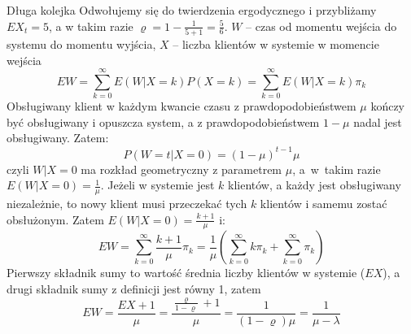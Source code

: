 \documentclass{mp}
\begin{document}
\begin{frame}{Długa kolejka}
{{	Odwołujemy się do twierdzenia ergodycznego i przybliżamy $EX_t=5$, a w takim razie $\varrho=1-\frac{1}{5+1}=\frac{5}{6}$.
}
{
	$W$ -- czas od momentu wejścia do systemu do momentu wyjścia, $X$ -- liczba klientów w systemie w momencie wejścia
	\[EW=\sum_{k=0}^\infty E(W|X=k)P(X=k)=\sum_{k=0}^\infty E(W|X=k)\pi_k \]
	Obsługiwany klient w każdym kwancie czasu z prawdopodobieństwem $\mu$ kończy być obsługiwany i opuszcza system, a z prawdopodobieństwem $1-\mu$ nadal jest obsługiwany. Zatem:
	\[ P(W=t|X=0)=(1-\mu)^{t-1}\mu \]
	czyli $W|X=0$ ma rozkład geometryczny z parametrem $\mu$, a~w~takim razie $E(W|X=0)=\frac{1}{\mu}$.
	Jeżeli w systemie jest $k$ klientów, a każdy jest obsługiwany niezależnie, to nowy klient musi przeczekać tych $k$ klientów i samemu zostać obsłużonym. Zatem $E(W|X=0)=\frac{k+1}{\mu}$ i:
	\[EW=\sum_{k=0}^\infty \frac{k+1}{\mu}\pi_k=\frac{1}{\mu}\left(\sum_{k=0}^\infty k\pi_k + \sum_{k=0}^\infty \pi_k\right) \]
	Pierwszy składnik sumy to wartość średnia liczby klientów w systemie ($EX$), a drugi składnik sumy z definicji jest równy 1, zatem
	\[EW=\frac{EX+1}{\mu}=\frac{\frac{\varrho}{1-\varrho}+1}{\mu}=\frac{1}{(1-\varrho)\mu}=\frac{1}{\mu-\lambda} \]
}
}
\end{frame}
\end{document}
